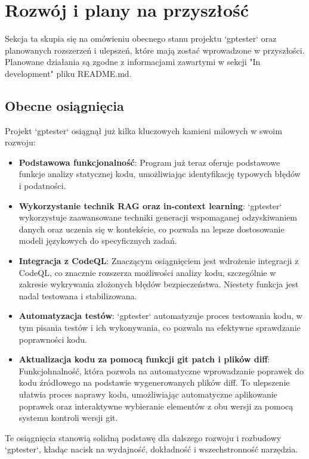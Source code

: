 \section{Rozwój i plany na przyszłość}
\label{sec:rozwoj_i_plany_na_przyszlosc}

Sekcja ta skupia się na omówieniu obecnego stanu projektu `gptester` oraz planowanych rozszerzeń i ulepszeń, które mają zostać wprowadzone w przyszłości. Planowane działania są zgodne z informacjami zawartymi w sekcji "In development" pliku README.md.

\subsection{Obecne osiągnięcia}
\label{subsec:obecne_osiagniecia}

Projekt `gptester` osiągnął już kilka kluczowych kamieni milowych w swoim rozwoju:

\begin{itemize}
    \item \textbf{Podstawowa funkcjonalność}: Program już teraz oferuje podstawowe funkcje analizy statycznej kodu, umożliwiając identyfikację typowych błędów i podatności.
    \item \textbf{Wykorzystanie technik RAG oraz in-context learning}: `gptester` wykorzystuje zaawansowane techniki generacji wspomaganej odzyskiwaniem danych oraz uczenia się w kontekście, co pozwala na lepsze dostosowanie modeli językowych do specyficznych zadań.
    \item \textbf{Integracja z CodeQL}: Znaczącym osiągnięciem jest wdrożenie integracji z CodeQL, co znacznie rozszerza możliwości analizy kodu, szczególnie w zakresie wykrywania złożonych błędów bezpieczeństwa. Niestety funkcja jest nadal testowana i stabilizowana.
    \item \textbf{Automatyzacja testów}: `gptester` automatyzuje proces testowania kodu, w tym pisania testów i ich wykonywania, co pozwala na efektywne sprawdzanie poprawności kodu.
    \item \textbf{Aktualizacja kodu za pomocą funkcji git patch i plików diff}: Funkcjohnalność, która pozwola na automatyczne wprowadzanie poprawek do kodu źródłowego na podstawie wygenerowanych plików diff. To ulepszenie ułatwia proces naprawy kodu, umożliwiając automatyczne aplikowanie poprawek oraz interaktywne wybieranie elementów z obu wersji za pomocą systemu kontroli wersji git.
\end{itemize}

Te osiągnięcia stanowią solidną podstawę dla dalszego rozwoju i rozbudowy `gptester`, kładąc nacisk na wydajność, dokładność i wszechstronność narzędzia.

